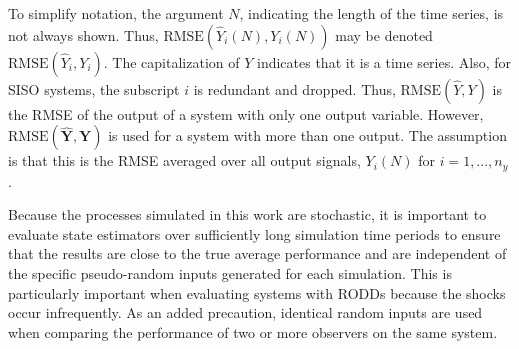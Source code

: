 {{To simplify notation, the argument $N$, indicating the length of the time series, is not always shown. Thus, $\textrm{RMSE}(\hat{Y}_i(N),Y_i(N))$ may be denoted $\textrm{RMSE}(\hat{Y}_i,Y_i)$. The capitalization of $Y$ indicates that it is a time series. Also, for \gls{SISO} systems, the subscript $i$ is redundant and dropped. Thus, $\textrm{RMSE}(\hat{Y},Y)$ is the \gls{RMSE} of the output of a system with only one output variable. However, $\textrm{RMSE}(\hat{\mathbf{Y}},\mathbf{Y})$ is used for a system with more than one output. The assumption is that this is the \gls{RMSE} averaged over all output signals, $Y_i(N)$ for $i=1, ..., n_y$.
%

Because the processes simulated in this work are stochastic, it is important to evaluate state estimators over sufficiently long simulation time periods to ensure that the results are close to the true average performance and are independent of the specific pseudo-random inputs generated for each simulation. This is particularly important when evaluating systems with \gls{RODD}s because the shocks occur infrequently. As an added precaution, identical random inputs are used when comparing the performance of two or more observers on the same system.

}}
